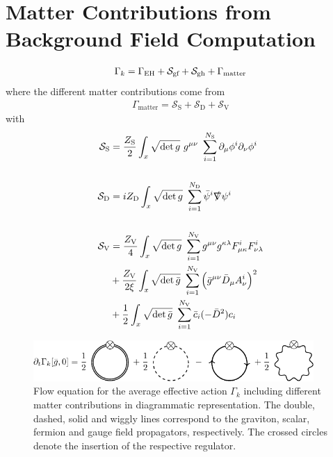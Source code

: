 \section{Matter Contributions from Background Field Computation}
\begin{align}
	\Gamma_{k} = \Gamma_{\text{EH}} + \mathcal{S}_{\text{gf}}+ \mathcal{S}_{\text{gh}}+ \Gamma_{\text{matter}}
\end{align}
where the different matter contributions come from
\begin{align}
	\Gamma_{\text{matter}} = \mathcal{S}_{\text{S}} + \mathcal{S}_{\text{D}} + \mathcal{S}_{\text{V}} 
\end{align}
with 
\begin{align}
	\mathcal{S}_{\text{S}} &= \frac{Z_{\text{S}}}{2}\int_x \sqrt{\operatorname{det}g} \ g^{\mu\nu} \ \sum\limits_{i=1}^{N_{\text{S}}} \partial_{\mu}\phi^{i}\partial_{\nu}\phi^{i} \\
	\phantom{.}\nonumber\\
	\mathcal{S}_{\text{D}} &= iZ_{\text{D}}\int_x \sqrt{\operatorname{det}g} \ \sum\limits_{i=1}^{N_{\text{D}}} \bar{\psi}^{i}\slashed{\nabla}\psi^{i}\\
	\phantom{.}\nonumber\\
		\mathcal{S}_{\text{V}} &= \frac{Z_{\text{V}}}{4}\int_x \sqrt{\operatorname{det}g} \ \sum\limits_{i=1}^{N_{\text{V}}} g^{\mu\nu}g^{\kappa\lambda}F^{i}_{\mu\kappa}F^{i}_{\nu\lambda} \nonumber \\
		&+ \frac{Z_{\text{V}}}{2\xi}\int_x \sqrt{\operatorname{det}\bar{g}} \ \sum\limits_{i=1}^{N_{\text{V}}} \left(\bar{g}^{\mu\nu}\bar{D}_{\mu}A_{\nu}^{i}\right)^2  \\
		&+ \frac{1}{2}\int_x \sqrt{\operatorname{det}\bar{g}} \ \sum\limits_{i=1}^{N_{\text{V}}} \bar{c}_i(-\bar{D}^2)c_i \nonumber
\end{align}
\begin{figure}[H]
	\centering
	\includegraphics[width=0.95\textwidth]{figs/TikZ/matter_corrections}
	\caption[Flow equation for the average effective action $\Gamma_k$ including different matter contributions in diagrammatic representation.]{Flow equation for the average effective action $\Gamma_k$ including different matter contributions in diagrammatic representation. The double, dashed, solid and  wiggly lines correspond to the graviton, scalar, fermion and gauge field  propagators, respectively. The crossed circles denote the insertion of the respective regulator.}
\end{figure}

